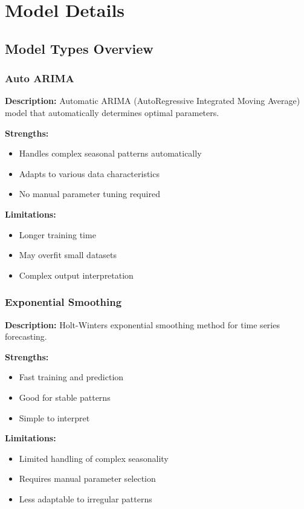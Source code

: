 \chapter{Model Details}

\section{Model Types Overview}

\subsection{Auto ARIMA}
\textbf{Description:} Automatic ARIMA (AutoRegressive Integrated Moving Average) model that automatically determines optimal parameters.

\textbf{Strengths:}
\begin{itemize}
	\item Handles complex seasonal patterns automatically
	\item Adapts to various data characteristics
	\item No manual parameter tuning required
\end{itemize}

\textbf{Limitations:}
\begin{itemize}
	\item Longer training time
	\item May overfit small datasets
	\item Complex output interpretation
\end{itemize}

\subsection{Exponential Smoothing}
\textbf{Description:} Holt-Winters exponential smoothing method for time series forecasting.

\textbf{Strengths:}
\begin{itemize}
	\item Fast training and prediction
	\item Good for stable patterns
	\item Simple to interpret
\end{itemize}

\textbf{Limitations:}
\begin{itemize}
	\item Limited handling of complex seasonality
	\item Requires manual parameter selection
	\item Less adaptable to irregular patterns
\end{itemize}

